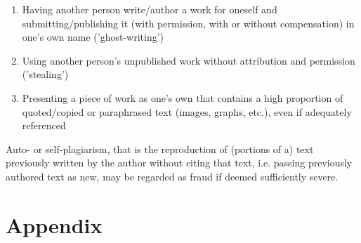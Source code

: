\documentclass[conference,compsoc]{IEEEtran}
\begin{document}
\begin{itemize}
\begin{enumerate}
          \item Having another person write/author a work for oneself and submitting/publishing it (with permission, with or without compensation) in one's own name ('ghost-writing')
          \item Using another person's unpublished work without attribution and permission ('stealing')
          \item Presenting a piece of work as one's own that contains a high proportion of quoted/copied or paraphrased text (images, graphs, etc.), even if adequately referenced
        \end{enumerate}
        Auto- or self-plagiarism, that is the reproduction of (portions of a) text previously written by the author without citing that text, i.e. passing previously authored text as new, may be regarded as fraud if deemed sufficiently severe.
\end{itemize}



\newpage
\nocite{bics-bsp-report-template}




\newpage
\section{Appendix}
\end{document}
